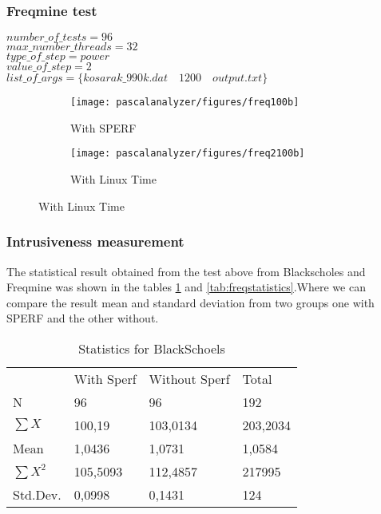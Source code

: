 \subsubsection{Freqmine test}

$number\_of\_tests=96$\\
$max\_number\_threads=32$\\
$type\_of\_step=power$\\
$value\_of\_step=2$\\
$list\_of\_args=\{kosarak\_990k.dat \quad 1200 \quad output.txt\}$

\begin{figure}[H]
	\centering
	\begin{subfigure}[b]{0.45\textwidth}
		\texttt{[image: pascalanalyzer/figures/freq100b]}
		\caption{With SPERF}
		\label{fig:freq100b}
	\end{subfigure}
	\begin{subfigure}[b]{0.45\textwidth}
		\texttt{[image: pascalanalyzer/figures/freq2100b]}
		\caption{With Linux Time}
		\label{fig:freq2100b}
	\end{subfigure}
\end{figure}


\subsubsection{Intrusiveness measurement}

The statistical result obtained from the test above from Blackscholes and Freqmine was shown in the tables \ref{tab:blackstatistics} and \ref{tab:freqstatistics}.Where we can compare the result mean and standard deviation from two groups one with SPERF and the other without.

\begin{table}[H]
	\centering
	\caption{Statistics for BlackSchoels}
	\label{tab:blackstatistics}
	\begin{tabular}{llll}
		& With Sperf & Without Sperf & Total    \\
		N               & 96         & 96            & 192      \\
		$\sum{X}$       & 100,19     & 103,0134      & 203,2034 \\
		Mean            & 1,0436     & 1,0731        & 1,0584   \\
		$\sum{X^2}$     & 105,5093   & 112,4857      & 217995   \\
		Std.Dev.        & 0,0998     & 0,1431        & 124     
	\end{tabular}
\end{table}

